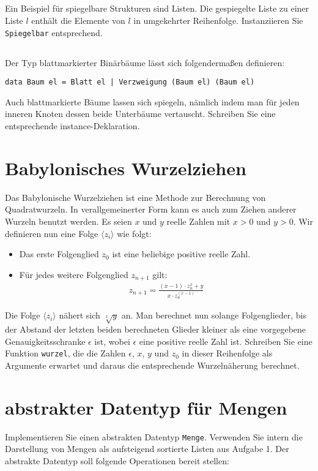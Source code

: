 \documentclass[
  10pt,                   %
  DIV12,
  german,                 %
  oneside,                %
  parskip=half,           %
  headings=normal,        %
  captions=tableheading,  %
]{scrartcl}
\begin{document}
\subsection{}
Ein Beispiel für spiegelbare Strukturen sind Listen. Die gespiegelte Liste zu einer
Liste $l$ enthält die Elemente von $l$ in umgekehrter Reihenfolge. Instanziieren Sie
\lstinline|Spiegelbar| entsprechend.
\subsection{} 
Der Typ blattmarkierter Binärbäume lässt sich folgendermaßen definieren:
\begin{center}
\lstinline!data Baum el = Blatt el | Verzweigung (Baum el) (Baum el)!
\end{center}

Auch blattmarkierte Bäume lassen sich spiegeln, nämlich indem man für jeden
inneren Knoten dessen beide Unterbäume vertauscht. Schreiben Sie eine entsprechende
instance-Deklaration.

\section{Babylonisches Wurzelziehen}
Das Babylonische Wurzelziehen ist eine Methode zur Berechnung von Quadratwurzeln.
In verallgemeinerter Form kann es auch zum Ziehen anderer Wurzeln benutzt werden.
Es seien $x$ und $y$ reelle Zahlen mit $x > 0$ und $y > 0$. Wir definieren nun eine Folge $\langle z_i \rangle$
wie folgt:
\begin{itemize}
  \item Das erste Folgenglied $z_0$ ist eine beliebige positive reelle Zahl.
  \item Für jedes weitere Folgenglied $z_{n+1}$ gilt: \\
  \begin{align*}
  z_{n+1} = \frac{(x-1) \cdot z_n^x + y}{x \cdot z_n^{(x-1)}}
  \end{align*}
\end{itemize}
Die Folge $\langle z_i \rangle$ nähert sich $\sqrt[x]{y}$ an. Man berechnet nun solange Folgenglieder, bis der
Abstand der letzten beiden berechneten Glieder kleiner als eine vorgegebene Genauigkeitsschranke
$\epsilon$ ist, wobei $\epsilon$ eine positive reelle Zahl ist. Schreiben Sie eine Funktion
\lstinline|wurzel|, die die Zahlen $\epsilon$, $x$, $y$ und $z_0$ in dieser Reihenfolge als Argumente erwartet und
daraus die entsprechende Wurzelnäherung berechnet.

\section{abstrakter Datentyp für Mengen}
Implementieren Sie einen abstrakten Datentyp \lstinline|Menge|. Verwenden Sie intern die Darstellung von Mengen als aufsteigend sortierte Listen aus Aufgabe 1.
Der abstrakte Datentyp soll folgende Operationen bereit stellen:
\end{document}
